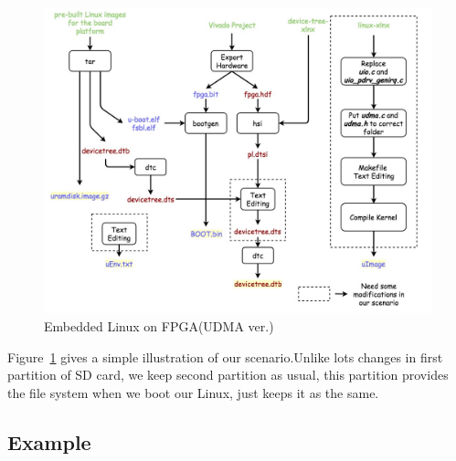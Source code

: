\begin{figure}[!htb]
  \centering
  \includegraphics[scale=0.4]{images/new_embedded_linux.jpg}
  \caption[Embedded Linux on FPGA(UDMA ver.)]{Embedded Linux on FPGA(UDMA ver.)}
  \label{fig:Embedded Linux on FPGA(UDMA ver.)}
\end{figure}

Figure~\ref{fig:Embedded Linux on FPGA(UDMA ver.)} gives a simple illustration of our scenario.Unlike lots changes in first partition of SD card, we keep second partition as usual, this partition provides the file system when we boot our Linux, just keeps it as the same.

\subsection{Example}
\label{subsec:Example}

